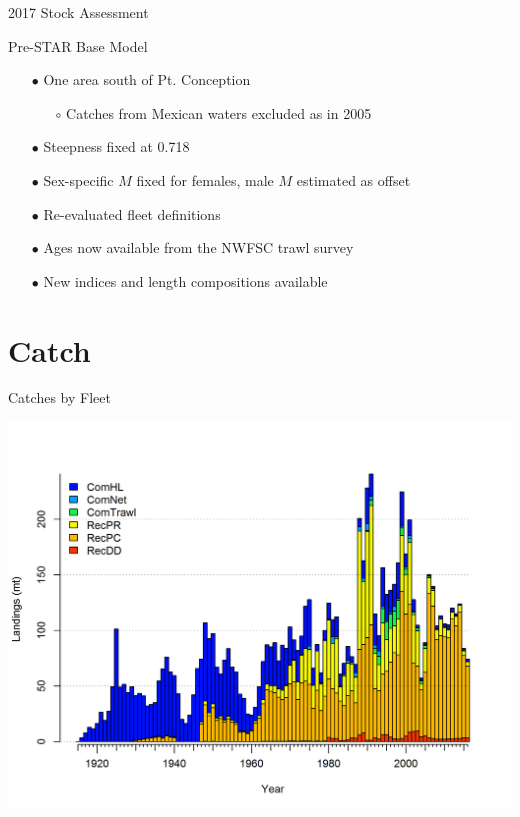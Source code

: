 \documentclass[ignorenonframetext,]{beamer}
\begin{document}
\begin{frame}{2017 Stock Assessment}

Pre-STAR Base Model

\begin{itemize}
\item[$\bullet$] One area south of Pt. Conception 
\begin{itemize}
\item[$\circ$] Catches from Mexican waters excluded as in 2005
\end{itemize}
\item[$\bullet$] Steepness fixed at 0.718
\item[$\bullet$] Sex-specific $M$ fixed for females, male $M$ estimated as offset
\item[$\bullet$] Re-evaluated fleet definitions
\item[$\bullet$] Ages now available from the NWFSC trawl survey
\item[$\bullet$] New indices and length compositions available
\end{itemize}

\end{frame}

\section{Catch}\label{catch}

\begin{frame}{Catches by Fleet}

\centering
\includegraphics{r4ss/plots_mod1/catch2 landings stacked.png}

\end{frame}
\end{document}
